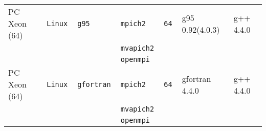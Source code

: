 \begin{tabular}{lllllll}
PC Xeon (64)          &\tt Linux  &\tt g95          &\tt mpich2     &\tt 64              & g95 \footnotesize 0.92(4.0.3)      & g++  \footnotesize 4.4.0        \\ %
                      &           &                 &\tt mvapich2   &                    &                                    &                                 \\
                      &           &                 &\tt openmpi    &                    &                                    &                                 \\
PC Xeon (64)          &\tt Linux  &\tt gfortran     &\tt mpich2     &\tt 64              & gfortran \footnotesize 4.4.0       & g++  \footnotesize 4.4.0        \\ %
                      &           &                 &\tt mvapich2   &                    &                                    &                                 \\
                      &           &                 &\tt openmpi    &                    &                                    &                                 \\

\end{tabular}
